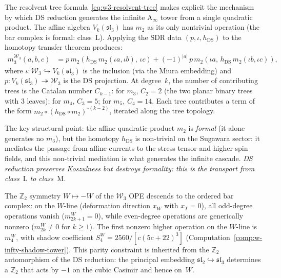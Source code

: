 \begin{remark}
\label{rem:w3-resolvent}
The resolvent tree formula~\eqref{eq:w3-resolvent-tree} makes
explicit the mechanism by which DS reduction generates the infinite
A$_\infty$ tower from a single quadratic product. The affine
algebra $V_k(\mathfrak{sl}_3)$ has $m_2$ as its only nontrivial
operation (the bar complex is formal: class~L). Applying the
SDR data $(p, \iota, h_{\mathrm{DS}})$ to the homotopy transfer
theorem produces:
\begin{align*}
m_3^{\mathcal{W}_3}(a,b,c)
&= p\, m_2(h_{\mathrm{DS}}\, m_2(\iota a, \iota b),\, \iota c)
+ (-1)^{|a|}\,
 p\, m_2(\iota a,\, h_{\mathrm{DS}}\, m_2(\iota b, \iota c)),
\end{align*}
where $\iota\colon \mathcal{W}_3 \hookrightarrow V_k(\mathfrak{sl}_3)$
is the inclusion (via the Miura embedding) and
$p\colon V_k(\mathfrak{sl}_3) \twoheadrightarrow \mathcal{W}_3$
is the DS projection. At degree~$k$, the number of contributing
trees is the Catalan number $C_{k-1}$: for $m_3$, $C_2 = 2$
(the two planar binary trees with $3$ leaves); for $m_4$, $C_3 = 5$;
for $m_5$, $C_4 = 14$. Each tree contributes a term of the form
$m_2 \circ (h_{\mathrm{DS}} \circ m_2)^{\circ (k-2)}$, iterated
along the tree topology.

The key structural point: the affine quadratic product $m_2$ is
\emph{formal} (it alone generates no $m_3$), but the homotopy
$h_{\mathrm{DS}}$ is non-trivial on the Sugawara sector: it
mediates the passage from affine currents to the stress tensor and
higher-spin fields, and this non-trivial mediation is what generates
the infinite cascade. \emph{DS reduction preserves Koszulness but
destroys formality: this is the transport from class~$\mathrm{L}$
to class~$\mathrm{M}$.}
\end{remark}

\begin{remark}
\label{rem:w3-parity-ordered}
The $\mathbb{Z}_2$ symmetry $W \mapsto -W$ of the $\mathcal{W}_3$ OPE
descends to the ordered bar complex: on the $W$-line (deformation
direction $x_W$ with $x_T = 0$), all odd-degree operations vanish
($m_{2k+1}^W = 0$), while even-degree operations are generically nonzero
($m_{2k}^W \neq 0$ for $k \geq 1$). The first nonzero higher
operation on the $W$-line is $m_4^W$, with shadow coefficient
$S_4^W = 2560/[c(5c+22)^3]$
(Computation~\ref{comp:w-infty-shadow-tower}).
This parity constraint
is inherited from the $\mathbb{Z}_2$ automorphism of the DS
reduction: the principal embedding $\mathfrak{sl}_2
\hookrightarrow \mathfrak{sl}_3$ determines a $\mathbb{Z}_2$
that acts by $-1$ on the cubic Casimir and hence on~$W$.
\end{remark}

